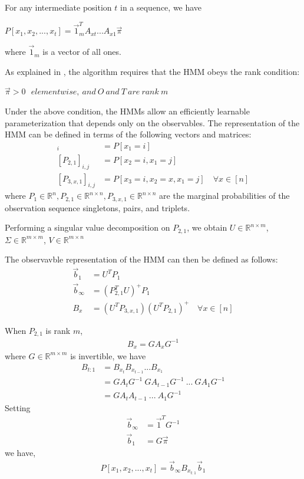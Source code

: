 \documentclass[letterpaper]{article}
\begin{document}
For any intermediate position $t$ in a sequence, we have

\begin{center}
	$P[x_{1}, x_{2}, ..., x_{t}] = \vec1_{m}^{T}A_{xt}...A_{x1}\vec\pi$
\end{center}
where $\vec1_{m}$ is a vector of all ones.

As explained in \cite{semen paper}, the algorithm requires that the HMM obeys the rank condition:
\begin{center}
	$\vec\pi > 0\ \ \ element wise,\ and\ O\ and\ T\ are\ rank\ m$
\end{center}
Under the above condition, the HMMs allow an efficiently learnable parameterization that depends only on the observables. The representation of the HMM can be defined in terms of the following vectors and matrices:
\begin{align*}
	[P_{1}]_{i}       & = P[x_{1} = i]                                         \\
	[P_{2,1}]_{i,j}   & = P[x_{2}=i, x_{1}=j]                                  \\
	[P_{3,x,1}]_{i,j} & = P[x_{3}=i, x_{2}=x, x_{1}=j] \quad \forall x \in [n] 
\end{align*}
where $P_{1} \in \mathbb{R}^{n}, P_{2,1} \in \mathbb{R}^{n \times n}, P_{3,x,1} \in \mathbb{R}^{n \times n}$ are the marginal probabilities of the observation sequence singletons, pairs, and triplets.

Performing a singular value decomposition on $P_{2,1}$, we obtain $U \in \mathbb{R}^{n \times m}$, $\Sigma \in \mathbb{R}^{m \times m}$, $V \in \mathbb{R}^{m \times n}$

The observavble representation of the HMM can then be defined as follows:
\begin{align*}
	\vec b_{1}      & = U^{T}P_{1}                                                 \\
	\vec b_{\infty} & = (P_{2,1}^{T}U)^{+}P_{1}                                    \\
	B_{x}           & = (U^{T}P_{3,x,1})(U^{T}P_{2,1})^{+} \quad \forall x \in [n] 
\end{align*}

When $P_{2,1}$ is rank $m$, 
\begin{align*}
B_{x} = GA_{x}G^{-1}
\end{align*}
where $G \in \mathbb{R}^{m \times m}$ is invertible, we have
\begin{align*}
B_{t:1} & = B_{x_{t}}B_{x_{t-1}}...B_{x_{1}} \\
			 & = GA_{t}G^{-1}\ GA_{t-1}G^{-1}\ ...\ GA_{1}G^{-1} \\
			 & = GA_{t}A_{t-1}\ ...\ A_{1}G^{-1}
\end{align*}
Setting 
\begin{align*}
\vec b_{\infty} & = \vec 1^{T}G^{-1} \\
\vec b_{1}      & = G\vec \pi 
\end{align*}
we have,
\begin{align*}
P[x_{1}, x_{2}, ..., x_{t}]  = \vec b_{\infty}B_{x_{t:1}} \vec b_{1} 
\end{align*}
\end{document}
